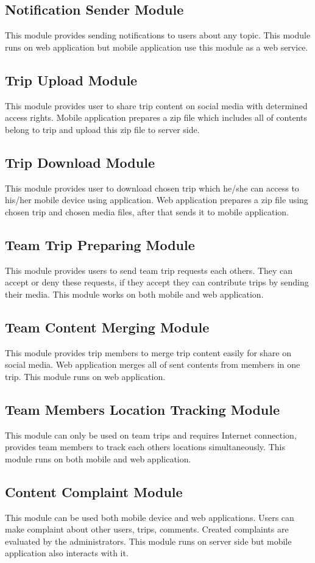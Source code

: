 \subsection{Notification Sender Module}   
This module provides sending notifications to users about any topic. This module runs on web application but mobile application use this module as a web service.
\subsection{Trip Upload Module}
This module provides user to share trip content on social media with determined access rights. Mobile application prepares a zip file which includes all of contents belong to trip and upload this zip file to server side.
\subsection{Trip Download Module}
This module provides user to download chosen trip  which he/she can access to his/her mobile device using application. Web application prepares a zip file using chosen trip and chosen media files, after that sends it to mobile application.
\subsection{Team Trip Preparing Module}
This module provides users to send team trip requests each others. They can accept or deny these requests, if they accept they can contribute trips by sending their media. This module works on both mobile and web application.

\subsection{Team Content Merging Module}
This module provides trip members to merge trip content easily for share on social media. Web application merges all of sent contents from members in one trip. This module runs on web application.

\subsection{Team Members Location Tracking Module}
This module can only be used on team trips and requires Internet connection, provides team members to track each others locations simultaneously. This module runs on both mobile  and web application.
   
\subsection{Content Complaint Module}   
This module can be used both mobile device and web applications. Users can make complaint about other users, trips, comments. Created complaints are evaluated by the administrators. This module runs on server side but mobile application also interacts with it.
    
